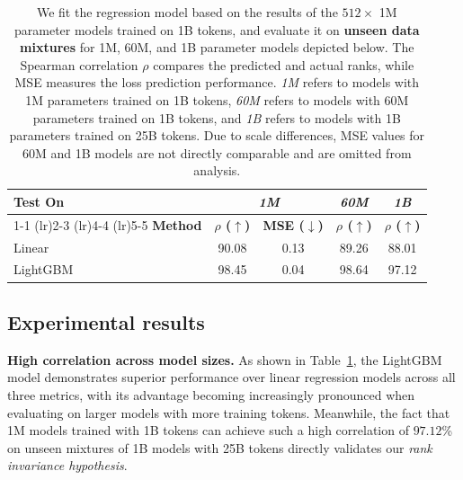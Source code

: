 \begin{table}[t]
    \centering
    \small
    \caption{We fit the regression model based on the results of the $512 \times$ 1M parameter models trained on 1B tokens, and evaluate it on \textbf{unseen data mixtures} for 1M, 60M, and 1B parameter models depicted below. The Spearman correlation $\rho$ compares the predicted and actual ranks, while MSE measures the loss prediction performance. \textit{1M} refers to models with 1M parameters trained on 1B tokens, \textit{60M} refers to models with 60M parameters trained on 1B tokens, and \textit{1B} refers to models with 1B parameters trained on 25B tokens. Due to scale differences, MSE values for 60M and 1B models are not directly comparable and are omitted from analysis.}
    \label{tab:linear_vs_lightgbm}
    \vspace{1mm}
    \begin{tabular}{lcccc}
        \toprule
        {Test On} & \multicolumn{2}{c}{\textit{1M}} & {\textit{60M}} & {\textit{1B}} \\
        
        \cmidrule(lr){1-1} \cmidrule(lr){2-3} \cmidrule(lr){4-4} \cmidrule(lr){5-5}
        \textbf{Method} & \textbf{$\rho$ ($\uparrow$)} & \textbf{MSE ($\downarrow$)} & \textbf{$\rho$ ($\uparrow$)} & \textbf{$\rho$ ($\uparrow$)} \\
        \midrule
        Linear & 90.08 & 0.13  & 89.26  & 88.01 \\
        {LightGBM} & {98.45} & {0.04} & {98.64}  & {97.12} \\
        \bottomrule
    \end{tabular}
\end{table}





\subsection{Experimental results}\label{sec:regression_results}


\textbf{High correlation across model sizes.}\;\;
As shown in Table~\ref{tab:linear_vs_lightgbm}, the LightGBM model demonstrates superior performance over linear regression models across all three metrics, with its advantage becoming increasingly pronounced when evaluating on larger models with more training tokens.
Meanwhile, the fact that 1M models trained with 1B tokens can achieve such a high correlation of $97.12$\% on unseen mixtures of 1B models with 25B tokens directly validates our \textit{rank invariance hypothesis}. 


